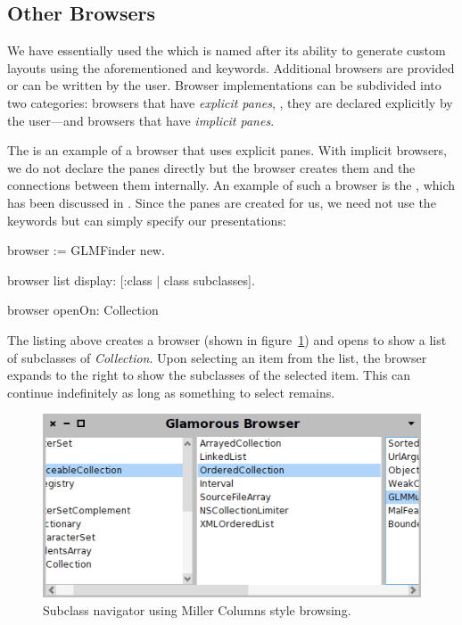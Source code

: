 \documentclass[a4paper,10pt,twoside]{book}
\begin{document}
\subsection{Other Browsers}

We have essentially used the 
which is named after its ability to generate custom layouts using the
aforementioned  and  keywords. Additional
browsers are provided or can be written by the user. Browser
implementations can be subdivided into two categories: browsers that
have \emph{explicit panes}, \ie{}, they are declared explicitly by the
user---and browsers that have \emph{implicit panes}.

The  is an example of a browser that uses explicit
panes. With implicit browsers, we do not declare the panes directly
but the browser creates them and the connections between them
internally. An example of such a browser is the , which has
been discussed in . Since the panes are
created for us, we need not use the  keywords but can
simply specify our presentations:

\begin{code}{}
browser := GLMFinder new.

browser list
  display: [:class | class subclasses].

browser openOn: Collection
\end{code}

The listing above creates a browser (shown in figure~\ref{fig:finder})
and opens to show a list of subclasses of \emph{Collection}. Upon
selecting an item from the list, the browser expands to the right to
show the subclasses of the selected item. This can continue
indefinitely as long as something to select remains.

\begin{figure}[htbp]
\centerline{\includegraphics[width=\linewidth]{finder.png}}
\caption{Subclass navigator using Miller Columns style browsing.}
\label{fig:finder}
\end{figure}
\end{document}
